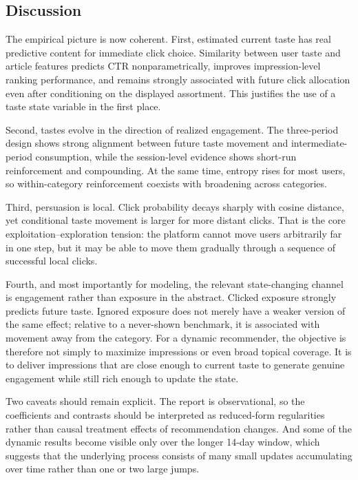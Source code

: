 \documentclass[11pt]{article}
\begin{document}
\subsection{Discussion}
\label{sec:discussion}

The empirical picture is now coherent. First, estimated current taste has real predictive content for immediate click choice. Similarity between user taste and article features predicts CTR nonparametrically, improves impression-level ranking performance, and remains strongly associated with future click allocation even after conditioning on the displayed assortment. This justifies the use of a taste state variable in the first place.

Second, tastes evolve in the direction of realized engagement. The three-period design shows strong alignment between future taste movement and intermediate-period consumption, while the session-level evidence shows short-run reinforcement and compounding. At the same time, entropy rises for most users, so within-category reinforcement coexists with broadening across categories.

Third, persuasion is local. Click probability decays sharply with cosine distance, yet conditional taste movement is larger for more distant clicks. That is the core exploitation--exploration tension: the platform cannot move users arbitrarily far in one step, but it may be able to move them gradually through a sequence of successful local clicks.

Fourth, and most importantly for modeling, the relevant state-changing channel is engagement rather than exposure in the abstract. Clicked exposure strongly predicts future taste. Ignored exposure does not merely have a weaker version of the same effect; relative to a never-shown benchmark, it is associated with movement away from the category. For a dynamic recommender, the objective is therefore not simply to maximize impressions or even broad topical coverage. It is to deliver impressions that are close enough to current taste to generate genuine engagement while still rich enough to update the state.

Two caveats should remain explicit. The report is observational, so the coefficients and contrasts should be interpreted as reduced-form regularities rather than causal treatment effects of recommendation changes. And some of the dynamic results become visible only over the longer 14-day window, which suggests that the underlying process consists of many small updates accumulating over time rather than one or two large jumps.
\end{document}
